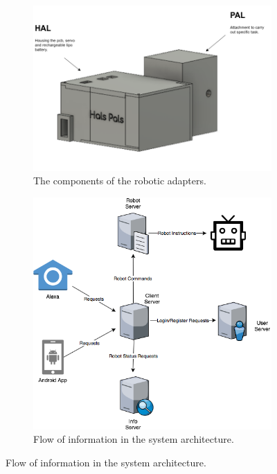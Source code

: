 \documentclass[onecolumn]{IEEEtran}
\begin{document}
    \begin{figure}[h]
    \begin{subfigure}{.5\textwidth}
                \centering
                \includegraphics[width=1\textwidth]{images/HALandPAL.png}
               \caption{The components of the robotic adapters.}\label{fig:HalAndPal}
            \end{subfigure}\hfill
            \begin{subfigure}{.5\textwidth}
                \centering
                \includegraphics[width=1\textwidth]{images/ArchitectureFlow.png}
              \caption{Flow of information in the system architecture.}\label{fig:ArchitectureFlow}
            \end{subfigure}\hfill
            \end{figure}
        
\end{document}
